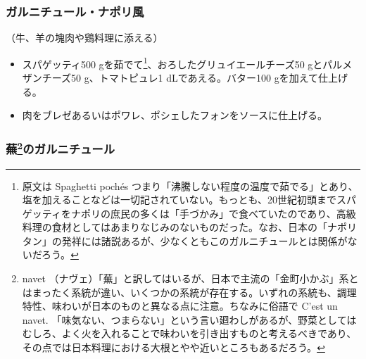 \begin{recette}
\hypertarget{garniture-a-la-napolitaine}{%
\subsubsection{ガルニチュール・ナポリ風}\label{garniture-a-la-napolitaine}}



（牛、羊の塊肉や鶏料理に添える）

\begin{itemize}
\item
  スパゲッティ500 gを茹でて\footnote{原文は Spaghetti pochés
    つまり「沸騰しない程度の温度で茹でる」とあり、塩を加えることなどは一切記されていない。もっとも、20世紀初頭までスパゲッティをナポリの庶民の多くは「手づかみ」で食べていたのであり、高級料理の食材としてはあまりなじみのないものだった。なお、日本の「ナポリタン」の発祥には諸説あるが、少なくともこのガルニチュールとは関係がないだろう。}、おろしたグリュイエールチーズ50
  gとパルメザンチーズ50 g、トマトピュレ1 dLであえる。バター100
  gを加えて仕上げる。
\item
  肉をブレゼあるいはポワレ、ポシェしたフォンをソースに仕上げる。
\end{itemize}

\hypertarget{garniture-aux-navets}{%
\subsubsection[蕪のガルニチュール]{\texorpdfstring{蕪\footnote{navet
  （ナヴェ）「蕪」と訳してはいるが、日本で主流の「金町小かぶ」系とはまったく系統が違い、いくつかの系統が存在する。いずれの系統も、調理特性、味わいが日本のものと異なる点に注意。ちなみに俗語で
  C'est un navet.
  「味気ない、つまらない」という言い廻わしがあるが、野菜としてはむしろ、よく火を入れることで味わいを引き出すものと考えるべきであり、その点では日本料理における大根とやや近いところもあるだろう。}のガルニチュール}{蕪のガルニチュール}}\label{garniture-aux-navets}}




\end{recette}
